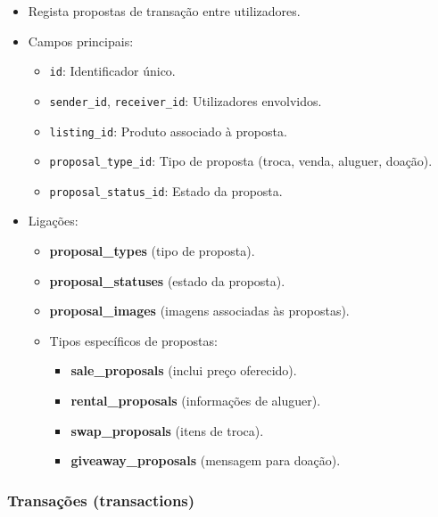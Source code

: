 \documentclass[a4paper, 12pt]{article} %
\begin{document}
\begin{itemize}
	\item Regista propostas de transação entre utilizadores.
	\item Campos principais:
	\begin{itemize}
		\item \verb|id|: Identificador único.
		\item \verb|sender_id|, \verb|receiver_id|: Utilizadores envolvidos.
		\item \verb|listing_id|: Produto associado à proposta.
		\item \verb|proposal_type_id|: Tipo de proposta (troca, venda, aluguer, doação).
		\item \verb|proposal_status_id|: Estado da proposta.
	\end{itemize}
	\item Ligações:
	\begin{itemize}
		\item \textbf{proposal\_types} (tipo de proposta).
		\item \textbf{proposal\_statuses} (estado da proposta).
        \item \textbf{proposal\_images} (imagens associadas às propostas).
		\item Tipos específicos de propostas:
		\begin{itemize}
			\item \textbf{sale\_proposals} (inclui preço oferecido).
			\item \textbf{rental\_proposals} (informações de aluguer).
			\item \textbf{swap\_proposals} (itens de troca).
			\item \textbf{giveaway\_proposals} (mensagem para doação).
		\end{itemize}
	\end{itemize}
\end{itemize}

\subsubsection{\textbf{Transações (transactions)}}
\end{document}
